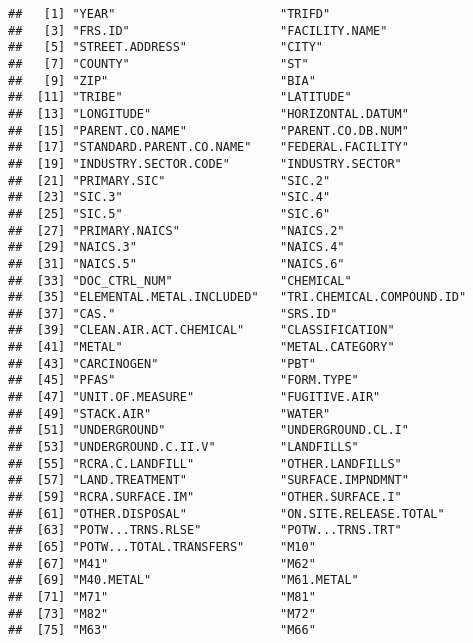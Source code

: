 \documentclass[
]{article}
\begin{document}
\begin{verbatim}
##   [1] "YEAR"                       "TRIFD"                     
##   [3] "FRS.ID"                     "FACILITY.NAME"             
##   [5] "STREET.ADDRESS"             "CITY"                      
##   [7] "COUNTY"                     "ST"                        
##   [9] "ZIP"                        "BIA"                       
##  [11] "TRIBE"                      "LATITUDE"                  
##  [13] "LONGITUDE"                  "HORIZONTAL.DATUM"          
##  [15] "PARENT.CO.NAME"             "PARENT.CO.DB.NUM"          
##  [17] "STANDARD.PARENT.CO.NAME"    "FEDERAL.FACILITY"          
##  [19] "INDUSTRY.SECTOR.CODE"       "INDUSTRY.SECTOR"           
##  [21] "PRIMARY.SIC"                "SIC.2"                     
##  [23] "SIC.3"                      "SIC.4"                     
##  [25] "SIC.5"                      "SIC.6"                     
##  [27] "PRIMARY.NAICS"              "NAICS.2"                   
##  [29] "NAICS.3"                    "NAICS.4"                   
##  [31] "NAICS.5"                    "NAICS.6"                   
##  [33] "DOC_CTRL_NUM"               "CHEMICAL"                  
##  [35] "ELEMENTAL.METAL.INCLUDED"   "TRI.CHEMICAL.COMPOUND.ID"  
##  [37] "CAS."                       "SRS.ID"                    
##  [39] "CLEAN.AIR.ACT.CHEMICAL"     "CLASSIFICATION"            
##  [41] "METAL"                      "METAL.CATEGORY"            
##  [43] "CARCINOGEN"                 "PBT"                       
##  [45] "PFAS"                       "FORM.TYPE"                 
##  [47] "UNIT.OF.MEASURE"            "FUGITIVE.AIR"              
##  [49] "STACK.AIR"                  "WATER"                     
##  [51] "UNDERGROUND"                "UNDERGROUND.CL.I"          
##  [53] "UNDERGROUND.C.II.V"         "LANDFILLS"                 
##  [55] "RCRA.C.LANDFILL"            "OTHER.LANDFILLS"           
##  [57] "LAND.TREATMENT"             "SURFACE.IMPNDMNT"          
##  [59] "RCRA.SURFACE.IM"            "OTHER.SURFACE.I"           
##  [61] "OTHER.DISPOSAL"             "ON.SITE.RELEASE.TOTAL"     
##  [63] "POTW...TRNS.RLSE"           "POTW...TRNS.TRT"           
##  [65] "POTW...TOTAL.TRANSFERS"     "M10"                       
##  [67] "M41"                        "M62"                       
##  [69] "M40.METAL"                  "M61.METAL"                 
##  [71] "M71"                        "M81"                       
##  [73] "M82"                        "M72"                       
##  [75] "M63"                        "M66"                       

\end{verbatim}
\end{document}
